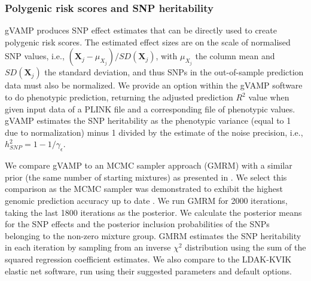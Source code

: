 \subsubsection{Polygenic risk scores and SNP heritability}
gVAMP produces SNP effect estimates that can be directly used to create polygenic risk scores. The estimated effect sizes are on the scale of normalised SNP values, i.e., $(\bm{X}_j - \mu_{X_j}) / SD(\bm{X}_j)$, with $\mu_{X_j}$ the column mean and $SD(\bm{X}_j)$ the standard deviation, and thus SNPs in the out-of-sample prediction data must also be normalized. We provide an option within the gVAMP software to do phenotypic prediction, returning the adjusted prediction $R^2$ value when given input data of a PLINK file and a corresponding file of phenotypic values. gVAMP estimates the SNP heritability as the phenotypic variance (equal to 1 due to normalization) minus 1 divided by the estimate of the noise precision, i.e., $h_{SNP}^2=1-1/\gamma_\epsilon$. 

We compare gVAMP to an MCMC sampler approach (GMRM) with a similar prior (the same number of starting mixtures) as presented in \cite{Orliac2022}. We select this comparison as the MCMC sampler was demonstrated to exhibit the highest genomic prediction accuracy up to date \cite{Orliac2022}. We run GMRM for 2000 iterations, taking the last 1800 iterations as the posterior. We calculate the posterior means for the SNP effects and the posterior inclusion probabilities of the SNPs belonging to the non-zero mixture group. GMRM estimates the SNP heritability in each iteration by sampling from an inverse $\chi^2$ distribution using the sum of the squared regression coefficient estimates. We also compare to the LDAK-KVIK elastic net software\cite{hof2024ldak}, run using their suggested parameters and default options. 

